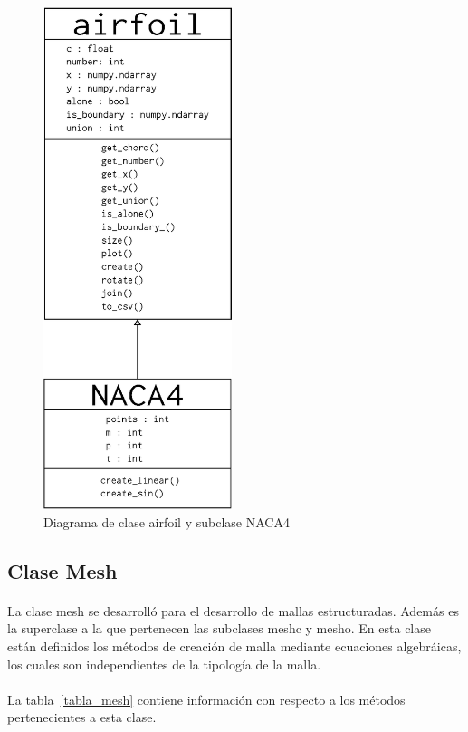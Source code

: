 \documentclass[letterpaper, openright, 12pt]{book}
\begin{document}
    \begin{figure}[H]
        \centering
        \includegraphics[keepaspectratio, width=55mm]{./Imagenes/airfoil_class}
        \caption[Diagrama de clase airfoil y subclase NACA4]{Diagrama de clase airfoil y subclase
        NACA4}
        \label{airfoil_class}
    \end{figure}


    \subsection{Clase Mesh}
    \paragraph*{}
        La clase mesh se desarrolló para el desarrollo de mallas estructuradas.
        Además es la superclase a la que pertenecen las subclases
        mesh\textunderscore c y mesh\textunderscore o. En esta clase están
        definidos los métodos de creación de malla mediante ecuaciones
        algebráicas, los cuales son independientes de la tipología de la malla.

    \paragraph*{}
        La tabla~\ref{tabla_mesh} contiene información con respecto a los
        métodos pertenecientes a esta clase.
\end{document}
